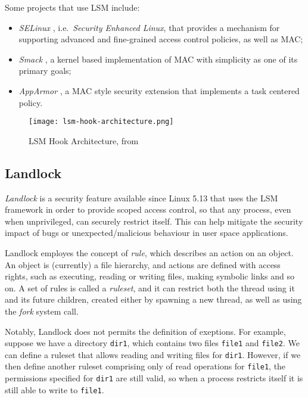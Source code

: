 Some projects that use LSM include:
\begin{itemize}
  \item \textit{SELinux} \cite{selinux}, i.e.\ \textit{Security Enhanced Linux}, that provides a mechanism for supporting advanced and fine-grained access control policies, as well as MAC;
  \item \textit{Smack} \cite{smack}, a kernel based implementation of MAC with simplicity as one of its primary goals;
  \item \textit{AppArmor} \cite{apparmor}, a MAC style security extension that implements a task centered policy.
\end{itemize}

\begin{figure}[h]
  \centering
  \texttt{[image: lsm-hook-architecture.png]}
  \caption{LSM Hook Architecture, from \cite{kernel-lsm}}
  \label{fig:lsm-hook-architecture}
\end{figure}

\subsection{Landlock}
\textit{Landlock} \cite{landlock-kernel} \cite{landlock-user-space} is a security feature available since Linux 5.13
that uses the LSM framework in order to provide scoped access control,
so that any process, even when unprivileged, can securely restrict itself.
This can help mitigate the security impact of bugs or unexpected/malicious behaviour
in user space applications.

Landlock employes the concept of \textit{rule}, which describes an action
on an object. An object is (currently) a file hierarchy, and actions are
defined with access rights, such as executing, reading or writing files, making
symbolic links and so on.
A set of rules is called a \textit{ruleset}, and it can restrict both the thread
using it and its future children, created either by spawning a new thread, as well
as using the \textit{fork} system call.

Notably, Landlock does not permits the definition of exeptions.
For example, suppose we have a directory \texttt{dir1}, which contains two files
\texttt{file1} and \texttt{file2}. We can define a ruleset that allows
reading and writing files for \texttt{dir1}.
However, if we then define another ruleset comprising only of read operations
for \texttt{file1}, the permissions specified for \texttt{dir1} are still
valid, so when a process restricts itself it is still able to write to \texttt{file1}.


